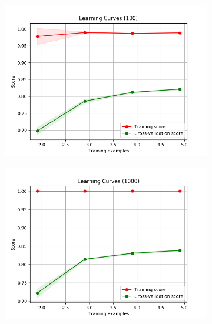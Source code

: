 \documentclass[12pt]{article}
\begin{document}
\begin{figure}[H]
	\centering
    \begin{subfigure}[c]{0.49\textwidth}
        \includegraphics[width=\textwidth]{images/RF100.png}
    \end{subfigure}
    \begin{subfigure}[c]{0.49\textwidth}
        \includegraphics[width=\textwidth]{images/RF1000.png}
    \end{subfigure}
\end{figure}




\newpage
\printbibliography
\end{document}
